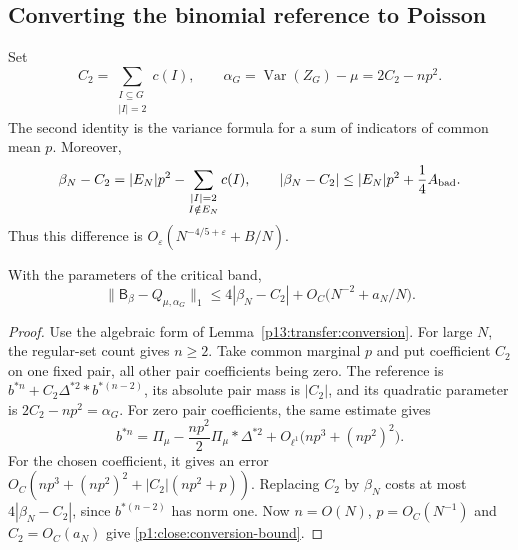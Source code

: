 \subsection{Converting the binomial reference to Poisson}

Set
\begin{equation}
 C_2=\sum_{\substack{I\subseteq G\\|I|=2}}c(I),
 \qquad
 \alpha_G=\operatorname{Var}(Z_G)-\mu=2C_2-np^2.
 \label{p1:close:variance}
\end{equation}
The second identity is the variance formula for a sum of
indicators of common mean $p$.  Moreover,
\begin{equation}
 \beta_N-C_2
       =|E_N|p^2-\sum_{\substack{|I|=2\\I\notin E_N}}c(I),
 \qquad
 |\beta_N-C_2|
       \le |E_N|p^2+\frac14A_{\rm bad}.
 \label{p1:close:beta-covariance}
\end{equation}
Thus this difference is
$O_\varepsilon(N^{-4/5+\varepsilon}+B/N)$.

\begin{lemma}
\label{p1:close:conversion}
With the parameters of the critical band,
\begin{equation}
 \|\mathsf B_\beta-Q_{\mu,\alpha_G}\|_1
 \le 4|\beta_N-C_2|+
           O_C\bigl(N^{-2}+a_N/N\bigr).
 \label{p1:close:conversion-bound}
\end{equation}
\end{lemma}

\begin{proof}
Use the algebraic form of Lemma~\ref{p13:transfer:conversion}.
For large $N$, the regular-set count gives $n\ge2$.
Take common marginal $p$ and put coefficient $C_2$ on one fixed
pair, all other pair coefficients being zero. The reference is
$b^{*n}+C_2\Delta^{*2}*b^{*(n-2)}$, its absolute pair mass is
$|C_2|$, and its quadratic parameter is $2C_2-np^2=\alpha_G$.
For zero pair coefficients, the same estimate gives
\begin{equation}
 b^{*n}
 =\Pi_\mu-\frac{np^2}{2}\Pi_\mu*\Delta^{*2}
           +O_{\ell^1}\bigl(np^3+(np^2)^2\bigr).
 \label{p1:close:binomial-expansion}
\end{equation}
For the chosen coefficient, it gives an error
$O_C(np^3+(np^2)^2+|C_2|(np^2+p))$.
Replacing $C_2$ by $\beta_N$ costs at most $4|\beta_N-C_2|$,
since $b^{*(n-2)}$ has norm one. Now $n=O(N)$,
$p=O_C(N^{-1})$ and $C_2=O_C(a_N)$ give
\eqref{p1:close:conversion-bound}.
\end{proof}

